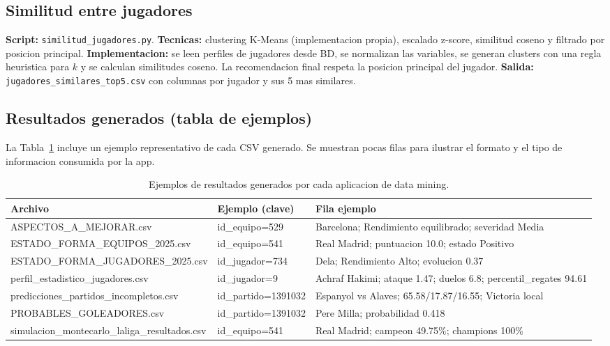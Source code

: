 \subsection{Similitud entre jugadores}
\textbf{Script:} \texttt{similitud\_jugadores.py}.\newline
\textbf{Tecnicas:} clustering K-Means (implementacion propia), escalado z-score, similitud coseno y filtrado por posicion principal.\newline
\textbf{Implementacion:} se leen perfiles de jugadores desde BD, se normalizan las variables, se generan clusters con una regla heuristica para $k$ y se calculan similitudes coseno. La recomendacion final respeta la posicion principal del jugador.
\textbf{Salida:} \texttt{jugadores\_similares\_top5.csv} con columnas por jugador y sus 5 mas similares.

\subsection{Resultados generados (tabla de ejemplos)}
La Tabla~\ref{tab:resultados-dm} incluye un ejemplo representativo de cada CSV generado. Se muestran pocas filas para ilustrar el formato y el tipo de informacion consumida por la app.

\begin{table}[h]
\centering
\small
\begin{tabular}{p{3.1cm} p{1.9cm} p{9.2cm}}
\hline
\textbf{Archivo} & \textbf{Ejemplo (clave)} & \textbf{Fila ejemplo} \\
\hline
ASPECTOS\_A\_MEJORAR.csv & id\_equipo=529 & Barcelona; Rendimiento equilibrado; severidad Media \\
ESTADO\_FORMA\_EQUIPOS\_2025.csv & id\_equipo=541 & Real Madrid; puntuacion 10.0; estado Positivo \\
ESTADO\_FORMA\_JUGADORES\_2025.csv & id\_jugador=734 & Dela; Rendimiento Alto; evolucion 0.37 \\
perfil\_estadistico\_jugadores.csv & id\_jugador=9 & Achraf Hakimi; ataque 1.47; duelos 6.8; percentil\_regates 94.61 \\
predicciones\_partidos\_incompletos.csv & id\_partido=1391032 & Espanyol vs Alaves; 65.58/17.87/16.55; Victoria local \\
PROBABLES\_GOLEADORES.csv & id\_partido=1391032 & Pere Milla; probabilidad 0.418 \\
simulacion\_montecarlo\_laliga\_resultados.csv & id\_equipo=541 & Real Madrid; campeon 49.75\%; champions 100\% \\
\hline
\end{tabular}
\caption{Ejemplos de resultados generados por cada aplicacion de data mining.}
\label{tab:resultados-dm}
\end{table}

